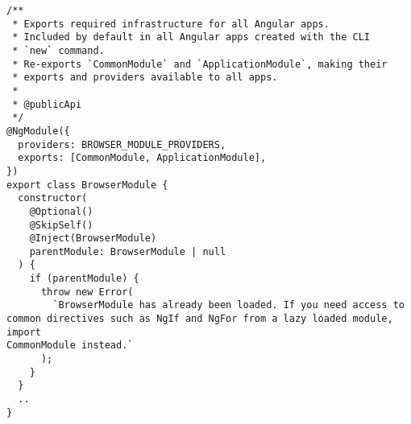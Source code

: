 \begin{verbatim}
/**
 * Exports required infrastructure for all Angular apps.
 * Included by default in all Angular apps created with the CLI
 * `new` command.
 * Re-exports `CommonModule` and `ApplicationModule`, making their
 * exports and providers available to all apps.
 *
 * @publicApi
 */
@NgModule({
  providers: BROWSER_MODULE_PROVIDERS,
  exports: [CommonModule, ApplicationModule],
})
export class BrowserModule {
  constructor(
    @Optional()
    @SkipSelf()
    @Inject(BrowserModule)
    parentModule: BrowserModule | null
  ) {
    if (parentModule) {
      throw new Error(
        `BrowserModule has already been loaded. If you need access to
common directives such as NgIf and NgFor from a lazy loaded module, import
CommonModule instead.`
      );
    }
  }
  ..
}
\end{verbatim}
